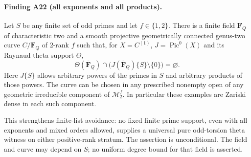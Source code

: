 \documentclass[11pt,a4paper]{article}
\begin{document}
\paragraph{Finding A22 (all exponents and all products).}
Let $S$ be any finite set of odd primes and let
$f\in\{1,2\}$.  There is a finite field $\mathbf F_Q$ of
characteristic two and a smooth projective geometrically
connected genus-two curve $C/\mathbf F_Q$ of $2$-rank $f$
such that, for $X=C^{(1)}$, $J=\operatorname{Pic}^0(X)$ and
its Raynaud theta support $\Theta$,
\[
       \Theta(\overline{\mathbf F}_Q)\cap
       \bigl(J(\overline{\mathbf F}_Q)\{S\}\setminus\{0\}\bigr)
                         =\varnothing.                       \tag{SA.1}
\]
Here $J\{S\}$ allows arbitrary powers of the primes in
$S$ and arbitrary products of those powers.
The curve can be chosen in any prescribed nonempty open
of any geometric irreducible component of
$\mathcal M_2^f$.  In particular these examples are
Zariski dense in each such component.

This strengthens finite-list avoidance: no fixed finite
prime support, even with all exponents and mixed orders
allowed, supplies a universal pure odd-torsion theta
witness on either positive-rank stratum.  The assertion
is unconditional.  The field and curve may depend on $S$;
no uniform degree bound for that field is asserted.
\end{document}
